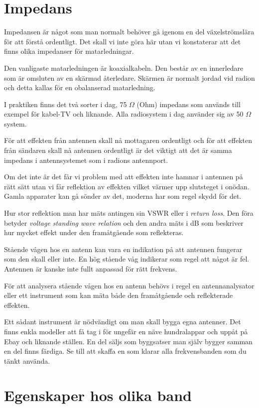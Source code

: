 \section{Impedans}

Impedansen är något som man normalt behöver gå igenom en del växelströmslära för att förstå ordentligt. Det skall vi inte göra här utan vi konstaterar att det finns olika impedanser för matarledningar.

Den vanligaste matarledningen är koaxialkabeln. Den består av en innerledare som är omsluten av en skärmad återledare. Skärmen är normalt jordad vid radion och detta kallas för en obalanserad matarledning.

I praktiken finns det två sorter i dag, 75 $\Omega$ (Ohm) impedans som används till exempel för kabel-TV och liknande. Alla radiosystem i dag använder sig av 50 $\Omega$ system. 

För att effekten från antennen skall nå mottagaren ordentligt och för att effekten från sändaren skall nå antennen ordentligt är det viktigt att det är samma impedans i antennsystemet som i radions antennport.

Om det inte är det får vi problem med att effekten inte hamnar i antennen på rätt sätt utan vi får reflektion av effekten vilket värmer upp slutsteget i onödan. Gamla apparater kan gå sönder av det, moderna har som regel skydd för det.

Hur stor reflektion man har mäts antingen sin VSWR eller i \textit{return loss}. Den föra betyder \textit{voltage standing wave relation} och den andra mäts i dB som beskriver hur mycket effekt under den framåtgående som reflekteras.

Stående vågen hos en antenn kan vara en indikation på att antennen fungerar som den skall eller inte. En hög stående våg indikerar som regel att något är fel. Antennen är kanske inte fullt anpassad för rätt frekvens.

För att analysera stående vågen hos en antenn behövs i regel en antennanalysator eller ett instrument som kan mäta både den framåtgående och reflekterade effekten. 

Ett sådant instrument är nödvändigt om man skall bygga egna antenner. Det finns enkla modeller att få tag i för ungefär en näve hundralappar och uppåt på Ebay och liknande ställen. En del säljs som byggsatser man själv bygger samman en del finns färdiga. Se till att skaffa en som klarar alla frekvensbanden som du tänkt använda.

\section{Egenskaper hos olika band}

